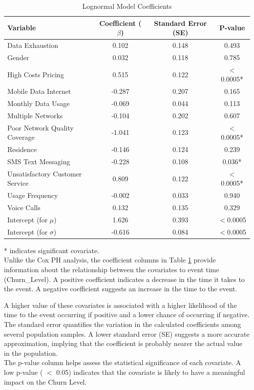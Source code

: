 \documentclass[doublespacing,12pt]{report}
\begin{document}
{\begin{table}[H]
\centering
\begin{tabular}{lccc}
\toprule
Variable & Coefficient (${\beta}$)& Standard Error (SE) & P-value\\
\midrule
Data Exhaustion& 0.102 & 0.148 & 0.493 \\
Gender & 0.032 & 0.118 & 0.785 \\
High Costs Pricing & 0.515 & 0.122 & $<$0.0005*\\
Mobile Data Internet & -0.287 & 0.207 & 0.165 \\
Monthly Data Usage & -0.069 & 0.044 & 0.113 \\
Multiple Networks & -0.104 & 0.202 & 0.607 \\
Poor Network Quality Coverage & -1.041 & 0.123 & $<$0.0005*\\
Residence & -0.146 & 0.124 & 0.239 \\
SMS Text Messaging & -0.228 & 0.108 & 0.036*\\
Unsatisfactory Customer Service & 0.809 & 0.122 & $<$0.0005*\\
Usage Frequency & -0.002 & 0.033 & 0.940 \\
Voice Calls & 0.132 & 0.135 & 0.329 \\
Intercept (for $\mu$) & 1.626 & 0.393 & $<$0.0005\\
Intercept (for $\sigma$) & -0.616 & 0.084 & $<$0.0005\\
\bottomrule
\end{tabular}
\caption{Lognormal Model Coefficients}
\label{table:lognormal_coefficients}
\end{table}
{* indicates significant covariate.}
\vspace{0.4cm}\\
\normalsize{\noindent Unlike the Cox PH analysis, the coefficient columns in Table \ref{table:lognormal_coefficients} provide information about the relationship between the covariates to event time (Churn\_Level). A positive coefficient indicates a decrease in the time it takes to the event. A negative coefficient suggests an increase in the time to the event. }

\normalsize{\noindent A higher value of these covariates is associated with a higher likelihood of the time to the event occurring if positive and a lower chance of occurring if negative.}
 \noindent The standard error quantifies the variation in the calculated coefficients among several population samples. A lower standard error (SE) suggests a more accurate approximation, implying that the coefficient is probably nearer the actual value in the population.\\
\normalsize{\noindent The p-value column helps assess the statistical significance of each covariate. A low p-value ( \(< \) 0.05) indicates that the covariate is likely to have a meaningful impact on the Churn Level. }

}
\end{document}
